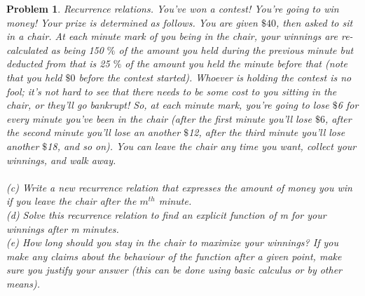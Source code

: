 \documentclass{article}
\newtheorem{problem}{Problem}
\theoremstyle{definition}
\begin{document}
\begin{problem}
Recurrence relations. You've won a contest! You're going to win money! Your prize is
determined as follows. You are given \(\$40\), then asked to sit in a chair. At each minute mark
of you being in the chair, your winnings are re-calculated as being 150 \(\%\) of the amount you
held during the previous minute but deducted from that is 25 \( \%\) of the amount you held the
minute before that (note that you held \(\$0\) before the contest started). Whoever is holding
the contest is no fool; it's not hard to see that there needs to be some cost to you sitting in
the chair, or they'll go bankrupt! So, at each minute mark, you're going to lose \(\$\)6 for every
minute you've been in the chair (after the first minute you'll lose \(\$6\), after the second minute
you'll lose an another \(\$\)12, after the third minute you'll lose another \(\$\)18, and so on). You
can leave the chair any time you want, collect your winnings, and walk away.\\\\

(c) Write a new recurrence relation that expresses the amount of money you win if you leave
the chair after the \(m^{th}\) minute.\\

(d) Solve this recurrence relation to find an explicit function of m for your winnings after m minutes.\\

(e) How long should you stay in the chair to maximize your winnings? If you make any
claims about the behaviour of the function after a given point, make sure you justify
your answer (this can be done using basic calculus or by other means).\\\\

\end{problem}
\end{document}
